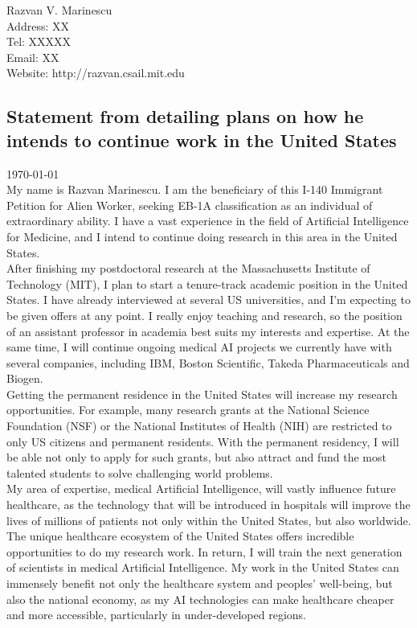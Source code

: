 \documentclass[11pt]{article}
\begin{document}
\vspace{4em}
Razvan V. Marinescu\\

Address: XX\\
Tel: XXXXX\\
Email: XX\\
Website: http://razvan.csail.mit.edu



\newpage



\subsection*{Statement from \dr detailing plans on how he intends to continue work in the United States}

\today\\


My name is Razvan Marinescu. I am the beneficiary of this I-140 Immigrant Petition for Alien Worker, seeking EB-1A classification as an individual of extraordinary ability. I have a vast experience in the field of Artificial Intelligence for Medicine, and I intend to continue doing research in this area in the United States.\\

After finishing my postdoctoral research at the Massachusetts Institute of Technology (MIT), I plan to start a tenure-track academic position in the United States. I have already interviewed at several US universities, and I'm expecting to be given offers at any point. I really enjoy teaching and research, so the position of an assistant professor in academia best suits my interests and expertise. At the same time, I will continue ongoing medical AI projects we currently have with several companies, including IBM, Boston Scientific, Takeda Pharmaceuticals and Biogen. \\

Getting the permanent residence in the United States will increase my research opportunities. For example, many research grants at the National Science Foundation (NSF) or the National Institutes of Health (NIH) are restricted to only US citizens and permanent residents. With the permanent residency, I will be able not only to apply for such grants, but also attract and fund the most talented students to solve challenging world problems. \\

My area of expertise, medical Artificial Intelligence, will vastly influence future healthcare, as the technology that will be introduced in hospitals will improve the lives of millions of patients not only within the United States, but also worldwide. The unique healthcare ecosystem of the United States offers incredible opportunities to do my research work. In return, I will train the next generation of scientists in medical Artificial Intelligence. My work in the United States can immensely benefit not only the healthcare system and peoples' well-being, but also the national economy, as my AI technologies can make healthcare cheaper and more accessible, particularly in under-developed regions.  \\
\end{document}
